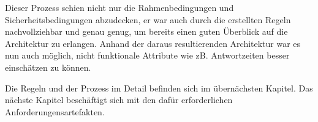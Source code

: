 Dieser Prozess schien nicht nur die Rahmenbedingungen und Sicherheitsbedingungen abzudecken, er war auch durch die erstellten Regeln nachvollziehbar und genau genug, um bereits einen guten Überblick auf die Architektur zu erlangen. Anhand der daraus resultierenden Architektur war es nun auch möglich, nicht funktionale Attribute wie zB. Antwortzeiten besser einschätzen zu können.

Die Regeln und der Prozess im Detail befinden sich im übernächsten Kapitel. Das nächste Kapitel beschäftigt sich mit den dafür erforderlichen Anforderungensartefakten.